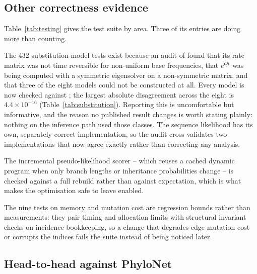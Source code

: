 \subsection{Other correctness evidence}

\begin{table}[t]
  \centering
  \small
  
  \caption{Test counts by area, and the continuous-integration configuration.
  Counts are collected by , which runs the
  suite and parses the result rather than restating it. The skipped count is
  environment dependent: the PhyloNet cross-check runs only where a jar and
  BEAGLE are installed, and it did run for the figures reported here.}
  \label{tab:testing}
\end{table}

Table~\ref{tab:testing} gives the test suite by area. Three of its entries are
doing more than counting.

The 432 substitution-model tests exist because an audit of
 found that its rate matrix was not time reversible for
non-uniform base frequencies, that $e^{Qt}$ was being computed with a symmetric
eigensolver on a non-symmetric matrix, and that three of the eight models could
not be constructed at all. Every model is now checked against
 \cite{Virtanen2020SciPy}; the largest absolute
disagreement across the eight is $4.4 \times 10^{-16}$
(Table~\ref{tab:substitution}). Reporting this is uncomfortable but
informative, and the reason no published result changes is worth stating
plainly: nothing on the inference path used those classes. The sequence
likelihood has its own, separately correct implementation, so the audit
cross-validates two implementations that now agree exactly rather than
correcting any analysis.

The incremental pseudo-likelihood scorer -- which reuses a cached dynamic
program when only branch lengths or inheritance probabilities change -- is
checked against a full rebuild rather than against expectation, which is what
makes the optimisation safe to leave enabled.

The nine tests on memory and mutation cost are regression bounds rather than
measurements: they pair timing and allocation limits with structural invariant
checks on incidence bookkeeping, so a change that degrades edge-mutation cost or
corrupts the indices fails the suite instead of being noticed later.

\subsection{Head-to-head against PhyloNet}
\label{sec:headtohead}

